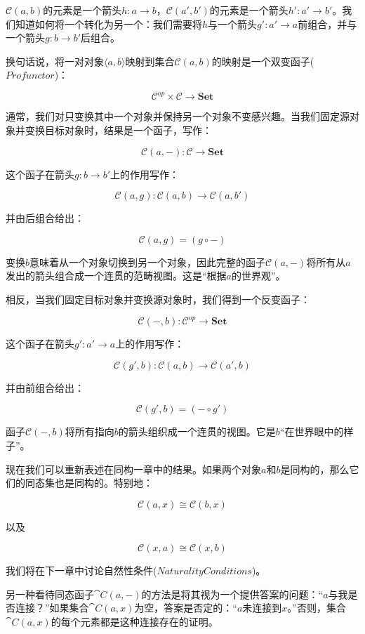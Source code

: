 \documentclass[DaoFP]{subfiles}
\begin{document}
    $\mathcal{C}(a, b)$的元素是一个箭头$h \colon a \to b$，$\mathcal{C}(a', b')$的元素是一个箭头$h' \colon a' \to b'$。我们知道如何将一个转化为另一个：我们需要将$h$与一个箭头$g' \colon a' \to a$前组合，并与一个箭头$g \colon b \to b'$后组合。

    换句话说，将一对对象$\langle a, b \rangle$映射到集合$\mathcal{C}(a, b)$的映射是一个双变函子($Profunctor$)：

    $$\mathcal{C}^{op} \times \mathcal{C} \to \mathbf{Set}$$

    通常，我们对只变换其中一个对象并保持另一个对象不变感兴趣。当我们固定源对象并变换目标对象时，结果是一个函子，写作：

    $$\mathcal{C}(a, -) \colon \mathcal{C} \to \mathbf{Set}$$

    这个函子在箭头$g \colon b \to b'$上的作用写作：

    $$\mathcal{C}(a, g) \colon \mathcal{C}(a, b) \to \mathcal{C}(a, b')$$

    并由后组合给出：

    $$\mathcal{C}(a, g) = (g \circ -)$$

    变换$b$意味着从一个对象切换到另一个对象，因此完整的函子$\mathcal{C}(a, -)$将所有从$a$发出的箭头组合成一个连贯的范畴视图。这是“根据$a$的世界观”。

    相反，当我们固定目标对象并变换源对象时，我们得到一个反变函子：

    $$\mathcal{C}(-, b) \colon \mathcal{C}^{op} \to \mathbf{Set}$$

    这个函子在箭头$g' \colon a' \to a$上的作用写作：

    $$\mathcal{C}(g', b) \colon \mathcal{C}(a, b) \to \mathcal{C}(a', b)$$

    并由前组合给出：

    $$\mathcal{C}(g', b) = (- \circ g')$$

    函子$\mathcal{C}(-, b)$将所有指向$b$的箭头组织成一个连贯的视图。它是$b$“在世界眼中的样子”。

    现在我们可以重新表述在同构一章中的结果。如果两个对象$a$和$b$是同构的，那么它们的同态集也是同构的。特别地：

    $$\mathcal{C}(a, x) \cong \mathcal{C}(b, x)$$

    以及

    $$\mathcal{C}(x, a) \cong \mathcal{C}(x, b)$$

    我们将在下一章中讨论自然性条件($Naturality Conditions$)。

    另一种看待同态函子$\cat C(a, -)$的方法是将其视为一个提供答案的问题：“$a$与我是否连接？”如果集合$\cat C(a, x)$为空，答案是否定的：“$a$未连接到$x$。”否则，集合$\cat C(a, x)$的每个元素都是这种连接存在的证明。
\end{document}
